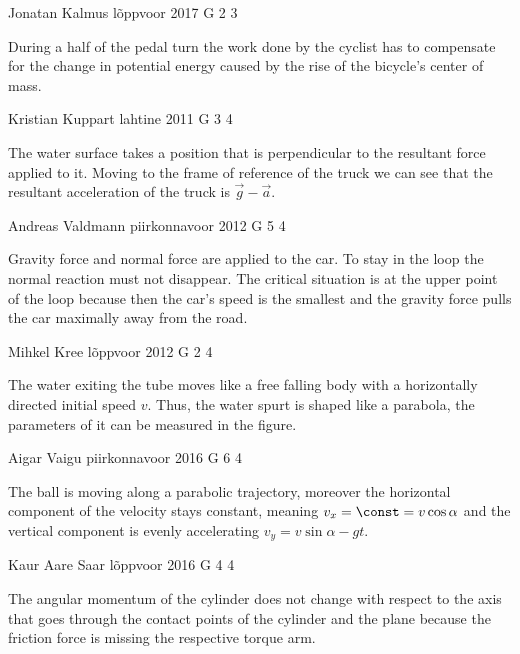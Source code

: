 \documentclass[11pt]{article}
\begin{document}
{Jonatan Kalmus} %
{lõppvoor} %
{2017} %
{G 2} %
{3} %
{

\ifEngHint
During a half of the pedal turn the work done by the cyclist has to compensate for the change in potential energy caused by the rise of the bicycle’s center of mass.
\fi
}

{Kristian Kuppart} %
{lahtine} %
{2011} %
{G 3} %
{4} %
{

\ifEngHint
The water surface takes a position that is perpendicular to the resultant force applied to it. Moving to the frame of reference of the truck we can see that the resultant acceleration of the truck is $\vec g - \vec a$.
\fi
}

{Andreas Valdmann} %
{piirkonnavoor} %
{2012} %
{G 5} %
{4} %
{

\ifEngHint
Gravity force and normal force are applied to the car. To stay in the loop the normal reaction must not disappear. The critical situation is at the upper point of the loop because then the car’s speed is the smallest and the gravity force pulls the car maximally away from the road.
\fi
}

{Mihkel Kree} %
{lõppvoor} %
{2012} %
{G 2} %
{4} %
{

\ifEngHint
The water exiting the tube moves like a free falling body with a horizontally directed initial speed $v$. Thus, the water spurt is shaped like a parabola, the parameters of it can be measured in the figure.
\fi
}

{Aigar Vaigu} %
{piirkonnavoor} %
{2016} %
{G 6} %
{4} %
{

\ifEngHint
The ball is moving along a parabolic trajectory, moreover the horizontal component of the velocity stays constant, meaning $v_x = \const = v\cos\alpha$ and the vertical component is evenly accelerating $v_y = v\sin\alpha - gt$.
\fi
}

{Kaur Aare Saar} %
{lõppvoor} %
{2016} %
{G 4} %
{4} %
{

\ifEngHint
The angular momentum of the cylinder does not change with respect to the axis that goes through the contact points of the cylinder and the plane because the friction force is missing the respective torque arm.
\fi
}
\end{document}
